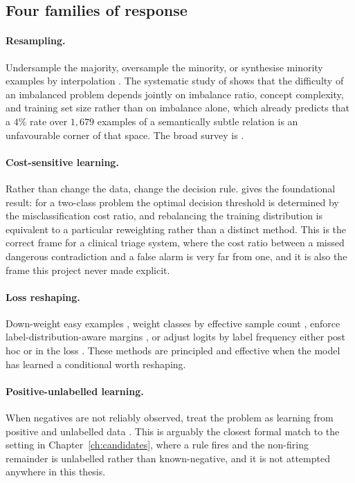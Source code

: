 \subsection{Four families of response}

\paragraph{Resampling.} Undersample the majority, oversample the minority, or
synthesise minority examples by interpolation \citep{chawla2002smote}. The
systematic study of \citet{japkowicz2002imbalance} shows that the difficulty of
an imbalanced problem depends jointly on imbalance ratio, concept complexity,
and training set size rather than on imbalance alone, which already predicts
that a $4\%$ rate over $1{,}679$ examples of a semantically subtle relation is
an unfavourable corner of that space. The broad survey is
\citet{he2009imbalanced}.

\paragraph{Cost-sensitive learning.} Rather than change the data, change the
decision rule. \citet{elkan2001cost} gives the foundational result: for a
two-class problem the optimal decision threshold is determined by the
misclassification cost ratio, and rebalancing the training distribution is
equivalent to a particular reweighting rather than a distinct method. This is
the correct frame for a clinical triage system, where the cost ratio between a
missed dangerous contradiction and a false alarm is very far from one, and it is
also the frame this project never made explicit.

\paragraph{Loss reshaping.} Down-weight easy examples \citep{lin2017focal},
weight classes by effective sample count \citep{cui2019classbalanced}, enforce
label-distribution-aware margins \citep{cao2019ldam}, or adjust logits by label
frequency either post hoc or in the loss \citep{menon2021logitadjust}. These
methods are principled and effective when the model has learned a conditional
worth reshaping.

\paragraph{Positive-unlabelled learning.} When negatives are not reliably
observed, treat the problem as learning from positive and unlabelled data
\citep{bekker2020pu}. This is arguably the closest formal match to the setting
in Chapter~\ref{ch:candidates}, where a rule fires and the non-firing remainder
is unlabelled rather than known-negative, and it is not attempted anywhere in
this thesis.

